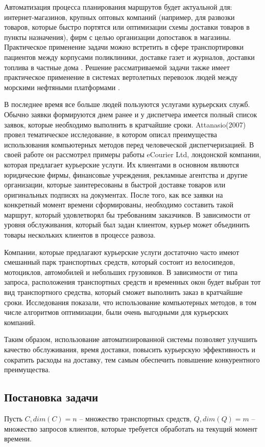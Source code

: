 \documentclass[]{TAACpaper}
\begin{document}
Автоматизация процесса планирования маршрутов будет актуальной для:  интернет-магазинов, крупных оптовых компаний (например, для развозки товаров, которые быстро портятся или оптимизации схемы доставки товаров в пункты назначения), фирм с целью организации допоставок в магазины. Практическое применение задачи можно встретить в сфере транспортировки пациентов между корпусами поликлиники\cite{Beaudry, Kergosien}, доставке газет и журналов, доставки топлива в частные дома \cite{Sarak}. Решение рассматриваемой задачи также имеет практическое применение в системах вертолетных перевозок людей между морскими нефтяными платформами \cite{Romero}.

В последнее время все больше людей пользуются услугами курьерских служб.  Обычно заявки формируются днем ранее и у диспетчера имеется полный список заявок, которые необходимо выполнить в кратчайшие сроки. Attanasio(2007) \cite{Attanasio} провел тематическое исследование, в котором описал преимущества использования компьютерных методов перед человеческой диспетчеризацией. В своей работе он рассмотрел примеры работы eCourier Ltd, лондонской компании, которая предлагает курьерские услуги. Их клиентами в основном являются юридические фирмы, финансовые учреждения, рекламные агентства и другие организации, которые заинтересованы в быстрой доставке товаров или оригинальных подписях на документах. После того, как все заявки на конкретный момент времени сформированы, необходимо составить такой маршрут, который удовлетворял бы требованиям заказчиков. В зависимости от уровня обслуживания, который был задан клиентом, курьер может объединить товары нескольких клиентов в процессе развоза. 

Компании, которые предлагают курьерские услуги достаточно часто имеют смешанный парк транспортных средств, который состоит из велосипедов, мотоциклов, автомобилей и небольших грузовиков. В зависимости от типа запроса, расположения транспортных средств и временных окон будет выбран тот вид транспортного средства, который сможет выполнить заказ в кратчайшие сроки. Исследования \cite{Attanasio} показали, что использование компьютерных методов, в том числе алгоритмов оптимизации, были очень выгодными для курьерских компаний.

Таким образом, использование автоматизированной системы позволяет улучшить качество обслуживания, время доставки, повысить курьерскую эффективность и сократить расходы на доставку, тем самым обеспечить повышение конкурентного преимущества.

\subsection{Постановка задачи}
Пусть $C,dim(C)=n$ -- множество транспортных средств, $Q,dim(Q)=m$ -- множество запросов клиентов, которые требуется обработать на текущий момент времени.
\end{document}
